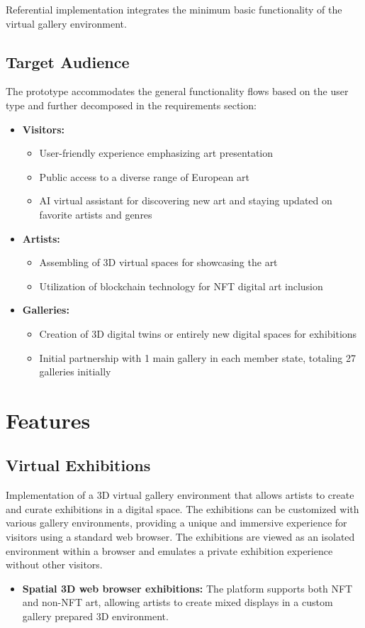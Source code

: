 Referential implementation integrates the minimum basic functionality of the virtual gallery environment.

\section{Target Audience}
The prototype accommodates the general functionality flows based on the user type and further decomposed in the requirements section:

\begin{itemize}
    \item \textbf{Visitors:}
        \begin{itemize}
            \item User-friendly experience emphasizing art presentation
            \item Public access to a diverse range of European art
            \item AI virtual assistant for discovering new art and staying updated on favorite artists and genres
        \end{itemize}
    \item \textbf{Artists:}
        \begin{itemize}
            \item Assembling of 3D virtual spaces for showcasing the art
        \item Utilization of blockchain technology for NFT digital art inclusion
        \end{itemize}
    \item \textbf{Galleries:}
        \begin{itemize}
            \item Creation of 3D digital twins or entirely new digital spaces for exhibitions
            \item Initial partnership with 1 main gallery in each member state, totaling 27 galleries initially
        \end{itemize}
\end{itemize}

\chapter{Features}

\section{Virtual Exhibitions}
Implementation of a 3D virtual gallery environment that allows artists to create and curate exhibitions in a digital space. The exhibitions can be customized with various gallery environments, providing a unique and immersive experience for visitors using a standard web browser. The exhibitions are viewed as an isolated environment within a browser and emulates a private exhibition experience without other visitors.
    \begin{itemize}
        \item \textbf{Spatial 3D web browser exhibitions:} The platform supports both NFT and non-NFT art, allowing artists to create mixed displays in a custom gallery prepared 3D environment. 
    \end{itemize}


